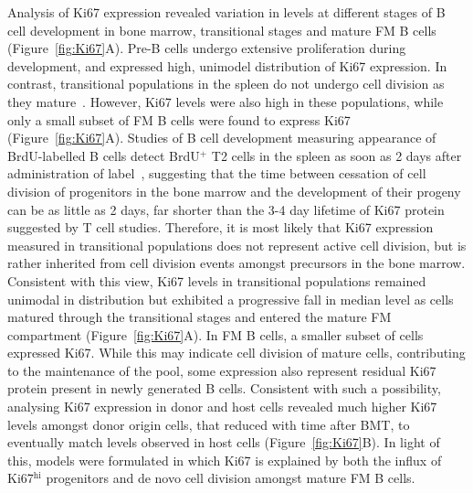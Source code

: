 \documentclass[11pt,onecolumn]{article}
\newcommand{\red}[1]{{\color{red}{#1}}}
\newcommand{\khi}{Ki67$^\text{hi}$}
\begin{document}
Analysis of Ki67 expression revealed variation in levels at different stages of B cell development in bone marrow, transitional stages and mature FM B cells (Figure~\ref{fig:Ki67}A). Pre-B cells undergo extensive proliferation during development, and expressed high, unimodel distribution of Ki67 expression. In contrast, transitional populations in the spleen do not undergo cell division as they mature~\citep{Srivastava:2005jja}. However, Ki67 levels were also high in these populations, while only a small subset of FM B cells were found to express Ki67 (Figure~\ref{fig:Ki67}A). Studies of B cell development measuring appearance of BrdU-labelled B cells detect BrdU$^{+}$ T2 cells in the spleen as soon as 2 days after administration of label~\citep{Srivastava:2005jja}, suggesting that the time between cessation of cell division of progenitors in the bone marrow and the development of their progeny can be as little as 2 days, far shorter than the 3-4 day lifetime of Ki67 protein suggested by T cell studies. Therefore, it is most likely that Ki67 expression measured in transitional populations does not represent active cell division, but is rather inherited from  cell division events amongst precursors in the bone marrow. Consistent with this view, Ki67 levels in transitional populations remained unimodal in distribution but exhibited a progressive fall in median level as cells matured through the transitional stages and entered the mature FM compartment (Figure~\ref{fig:Ki67}A). In FM B cells, a smaller subset of cells expressed Ki67. While this may indicate cell division of mature cells, contributing to the maintenance of the pool, some expression also represent residual Ki67 protein present in newly generated B cells. Consistent with such a possibility, analysing Ki67 expression in donor and host cells revealed much higher Ki67 levels amongst donor origin cells, that reduced with time after BMT, to eventually match levels observed in host cells (Figure~\ref{fig:Ki67}B). In light of this, models were formulated in which Ki67 is explained by both the influx of {\khi} progenitors and de novo cell division amongst mature FM B cells. 


\red{2019-02-07 All the FM analysis being redone to accommodate the YFP data - putting constraints on turnover parameters. So blue text is to be updated. GC analysis, however is done! Scroll down...}
\end{document}
